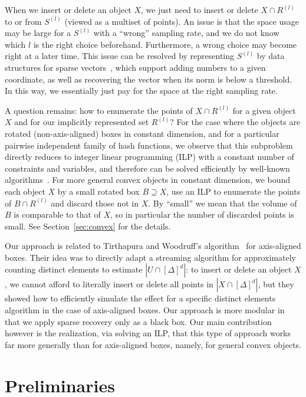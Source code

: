 \documentclass[a4paper, 11pt]{article}
\begin{document}
When we insert or delete an object $X$, we just need to insert or delete $X \cap R^{(l)}$ to or from $S^{(l)}$ (viewed as a multiset of points).
An issue is that the space usage may be large for a $S^{(l)}$ with a ``wrong'' sampling rate, and we do not know which $l$ is the right choice beforehand. Furthermore, a wrong choice may become right at a later time.
This issue can be resolved by representing $S^{(l)}$ by data structures for sparse vectors~\cite{FrahlingIS08,JowhariST11}, which support adding numbers to a given coordinate, as well as recovering the vector when its norm is below a threshold. In this way, we essentially just pay for the space at the right sampling rate.

A question remains: how to enumerate the points of $X \cap R^{(l)}$ for a given object $X$ and for our implicitly represented set $R^{(l)}$? For the case where the objects are rotated (non-axis-aligned) boxes in constant dimension, and for a particular pairwise independent family of hash functions, we observe that this subproblem directly reduces to integer linear programming (ILP) with a constant number of constraints and variables, and therefore can be solved efficiently by well-known algorithms~\cite{Lenstra83}.
For more general convex objects in constant dimension, we bound each object $X$ by a small rotated box $B \supseteq X$, use an ILP to enumerate the points of $B \cap R^{(l)}$ and discard those not in $X$. By ``small'' we mean that the volume of $B$ is comparable to that of $X$, so in particular the number of discarded points is small. See Section~\ref{sec:convex} for the details.

Our approach is related to Tirthapura and Woodruff's algorithm~\cite{TW12} for axis-aligned boxes. Their idea was to directly adapt a streaming algorithm for approximately counting distinct elements to estimate $|U\cap [\Delta]^d|$: 
to insert or delete an object $X$, we cannot afford to literally insert or delete all points in $|X\cap [\Delta]^d|$, but they showed how to efficiently simulate the effect for a specific distinct elements algorithm in the case of axis-aligned boxes.
Our approach is more modular in that we apply sparse recovery only as a black box.
Our main contribution however is the realization, via solving an ILP, that this type of approach works far more generally than for axis-aligned boxes, namely, for general convex objects.

\section{Preliminaries}
\label{sec:preliminaries}
\end{document}
